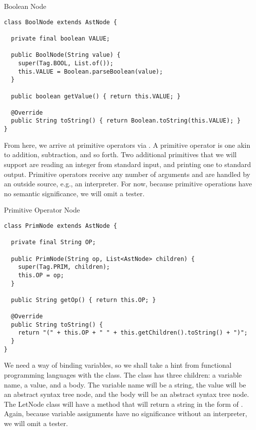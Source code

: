 \begin{cl}{Boolean Node}
\begin{lstlisting}[language=MyJava]
class BoolNode extends AstNode {

  private final boolean VALUE;

  public BoolNode(String value) {
    super(Tag.BOOL, List.of());
    this.VALUE = Boolean.parseBoolean(value);
  }

  public boolean getValue() { return this.VALUE; }

  @Override
  public String toString() { return Boolean.toString(this.VALUE); }
}
\end{lstlisting}
\end{cl}

From here, we arrive at primitive operators via . A primitive operator is one akin to addition, subtraction, and so forth. Two additional primitives that we will support are reading an integer from standard input, and printing one to standard output. Primitive operators receive any number of arguments and are handled by an outside source, e.g., an interpreter. For now, because primitive operations have no semantic significance, we will omit a tester.

\begin{cl}{Primitive Operator Node}
\begin{lstlisting}[language=MyJava]
class PrimNode extends AstNode {

  private final String OP;

  public PrimNode(String op, List<AstNode> children) {
    super(Tag.PRIM, children);
    this.OP = op;
  }

  public String getOp() { return this.OP; }

  @Override
  public String toString() {
    return "(" + this.OP + " " + this.getChildren().toString() + ")";
  }
}
\end{lstlisting}
\end{cl}

We need a way of binding variables, so we shall take a hint from functional programming languages with the  class. The  class has three children: a variable name, a value, and a body. The variable name will be a string, the value will be an abstract syntax tree node, and the body will be an abstract syntax tree node. The LetNode class will have a  method that will return a string in the form of . Again, because variable assignments have no significance without an interpreter, we will omit a tester.

